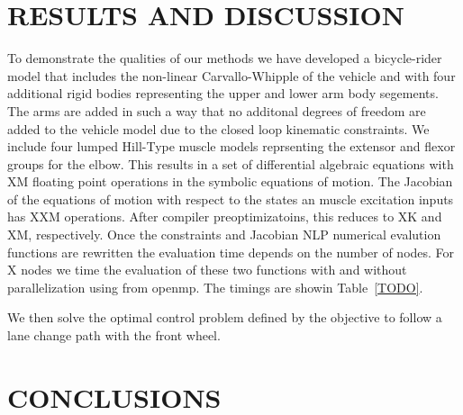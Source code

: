 \documentclass[11pt,twocolumn]{article}
\begin{document}
\section*{RESULTS AND DISCUSSION}
%
To demonstrate the qualities of our methods we have developed a bicycle-rider
model that includes the non-linear Carvallo-Whipple of the vehicle and with
four additional rigid bodies representing the upper and lower arm body
segements. The arms are added in such a way that no additonal degrees of
freedom are added to the vehicle model due to the closed loop kinematic
constraints. We include four lumped Hill-Type muscle models reprsenting the
extensor and flexor groups for the elbow. This results in a set of differential
algebraic equations with XM floating point operations in the symbolic equations
of motion. The Jacobian of the equations of motion with respect to the states
an muscle excitation inputs has XXM operations. After compiler
preoptimizatoins, this reduces to XK and XM, respectively. Once the constraints
and Jacobian NLP numerical evalution functions are rewritten the evaluation
time depends on the number of nodes. For X nodes we time the evaluation of
these two functions with and without parallelization using from openmp. The
timings are showin Table~\ref{TODO}.

We then solve the optimal control problem defined by the objective to follow a
lane change path with the front wheel.

\section*{CONCLUSIONS}
\end{document}
